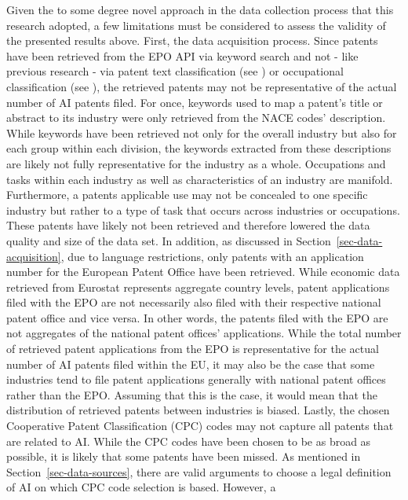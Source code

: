 \documentclass[
  12pt,
  a4paperpaper,
]{article}
\begin{document}
Given the to some degree novel approach in the data collection process
that this research adopted, a few limitations must be considered to
assess the validity of the presented results above. First, the data
acquisition process. Since patents have been retrieved from the EPO API
via keyword search and not - like previous research - via patent text
classification (see ) or occupational classification (see
), the retrieved
patents may not be representative of the actual number of AI patents
filed. For once, keywords used to map a patent's title or abstract to
its industry were only retrieved from the NACE codes' description. While
keywords have been retrieved not only for the overall industry but also
for each group within each division, the keywords extracted from these
descriptions are likely not fully representative for the industry as a
whole. Occupations and tasks within each industry as well as
characteristics of an industry are manifold. Furthermore, a patents
applicable use may not be concealed to one specific industry but rather
to a type of task that occurs across industries or occupations. These
patents have likely not been retrieved and therefore lowered the data
quality and size of the data set. In addition, as discussed in
Section~\ref{sec-data-acquisition}, due to language restrictions, only
patents with an application number for the European Patent Office have
been retrieved. While economic data retrieved from Eurostat represents
aggregate country levels, patent applications filed with the EPO are not
necessarily also filed with their respective national patent office and
vice versa. In other words, the patents filed with the EPO are not
aggregates of the national patent offices' applications. While the total
number of retrieved patent applications from the EPO is representative
for the actual number of AI patents filed within the EU, it may also be
the case that some industries tend to file patent applications generally
with national patent offices rather than the EPO. Assuming that this is
the case, it would mean that the distribution of retrieved patents
between industries is biased. Lastly, the chosen Cooperative Patent
Classification (CPC) codes may not capture all patents that are related
to AI. While the CPC codes have been chosen to be as broad as possible,
it is likely that some patents have been missed. As mentioned in
Section~\ref{sec-data-sources}, there are valid arguments to choose a
legal definition of AI on which CPC code selection is based. However, a
\end{document}
